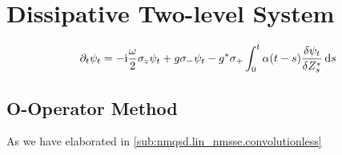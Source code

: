 \section{Dissipative Two-level System}
\label{sec:nmqsd.two_level}

\begin{equation*}
  \partial_t \psi_t = -\mathrm{i}\frac{\omega}{2}\sigma_z\psi_t + g \sigma_- \psi_t - {g}^*\sigma_+ \int_0^t \alpha(t - s) \frac{\delta\psi_t}{\delta {Z}^*_s} \, \mathrm{d} s
\end{equation*}

\subsection{O-Operator Method}
\label{sub:nmqsd.two_level.o}

As we have elaborated in \autoref{sub:nmqsd.lin_nmsse.convolutionless}


